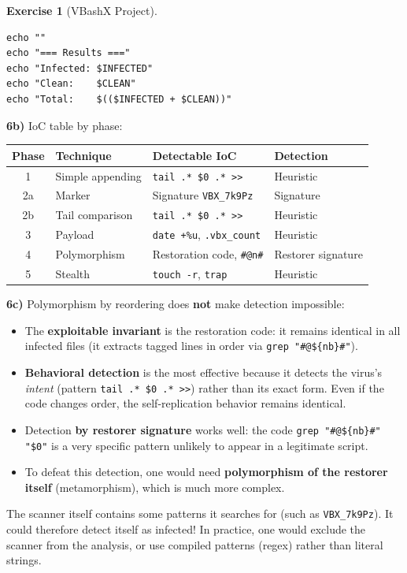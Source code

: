 \documentclass[a4paper,11pt]{article}
\theoremstyle{plain}
\theoremstyle{definition}
\newtheorem{exercice}{Exercise}
\begin{document}
\begin{exercice}[VBashX Project]
\begin{correction}
\begin{lstlisting}[title=scanner.sh]
echo ""
echo "=== Results ==="
echo "Infected: $INFECTED"
echo "Clean:    $CLEAN"
echo "Total:    $(($INFECTED + $CLEAN))"
\end{lstlisting}

\textbf{6b)} IoC table by phase:
\begin{center}
\begin{tabular}{clll}
\toprule
\textbf{Phase} & \textbf{Technique} & \textbf{Detectable IoC} & \textbf{Detection} \\
\midrule
1 & Simple appending & \texttt{tail .* \$0 .* >>} & Heuristic \\
2a & Marker & Signature \texttt{VBX\_7k9Pz} & Signature \\
2b & Tail comparison & \texttt{tail .* \$0 .* >>} & Heuristic \\
3 & Payload & \texttt{date +\%u}, \texttt{.vbx\_count} & Heuristic \\
4 & Polymorphism & Restoration code, \texttt{\#@n\#} & Restorer signature \\
5 & Stealth & \texttt{touch -r}, \texttt{trap} & Heuristic \\
\bottomrule
\end{tabular}
\end{center}

\textbf{6c)} Polymorphism by reordering does \textbf{not} make detection impossible:
\begin{itemize}
    \item The \textbf{exploitable invariant} is the restoration code: it remains identical in all infected files (it extracts tagged lines in order via \texttt{grep "\#@\$\{nb\}\#"}).
    \item \textbf{Behavioral detection} is the most effective because it detects the virus's \textit{intent} (pattern \texttt{tail .* \$0 .* >>}) rather than its exact form. Even if the code changes order, the self-replication behavior remains identical.
    \item Detection \textbf{by restorer signature} works well: the code \texttt{grep "\#@\$\{nb\}\#" "\$0"} is a very specific pattern unlikely to appear in a legitimate script.
    \item To defeat this detection, one would need \textbf{polymorphism of the restorer itself} (metamorphism), which is much more complex.
\end{itemize}

\begin{attention}
The scanner itself contains some patterns it searches for (such as \texttt{VBX\_7k9Pz}). It could therefore detect itself as infected! In practice, one would exclude the scanner from the analysis, or use compiled patterns (regex) rather than literal strings.
\end{attention}


\end{correction}
\end{exercice}
\end{document}
